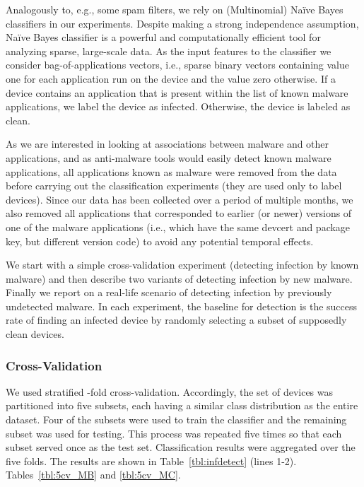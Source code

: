 Analogously to, e.g., some spam filters, we rely on (Multinomial)
Na{\"i}ve Bayes classifiers in our experiments. Despite making a strong
independence assumption, Na{\"i}ve Bayes classifier is a powerful and
computationally efficient tool for analyzing sparse, large-scale
data. As the input features to the classifier we consider
bag-of-applications vectors, i.e., sparse binary vectors containing
value one for each application run on the device and the value zero
otherwise.  If a device contains an application that is present within
the list of known malware applications, we label the device as
infected. Otherwise, the device is labeled as clean.

As we are interested in looking at associations between malware and
other applications, and as anti-malware tools would easily detect
known malware applications, all applications known as malware were
removed from the data before carrying out the classification
experiments (they are used only to label devices). Since our data has
been collected over a period of multiple months, we also removed all
applications that corresponded to earlier (or newer) versions of one
of the malware applications (i.e., which have the same devcert and
package key, but different version code) to avoid any potential
temporal effects.

We start with a simple cross-validation experiment (detecting
infection by known malware) and then describe two variants of
detecting infection by new malware.  Finally we report
on a real-life scenario of detecting infection by previously
undetected malware.  In each experiment, the baseline for detection
is the success rate of finding an infected device by randomly
selecting a subset of supposedly clean devices.




\subsubsection{Cross-Validation}
\label{subsubsec:predictions:applications:cross}

We used stratified -fold cross-validation. Accordingly, the set of devices was
partitioned into five subsets, each having a similar class distribution as
the entire dataset. Four of the subsets were used to train the
classifier and the remaining subset was used for testing. This process
was repeated five times so that each subset served once as the test
set.  Classification results were aggregated over the five folds. The
results are shown in 
\ifwww
Table~\ref{tbl:infdetect} (lines 1-2).
\else
Tables~\ref{tbl:5cv_MB} and
\ref{tbl:5cv_MC}.
\fi

